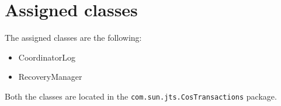 \section{Assigned classes}
\label{sec:classes}

The assigned classes are the following:
\begin{itemize}
    \item CoordinatorLog
    \item RecoveryManager
\end{itemize}

Both the classes are located in the \texttt{com.sun.jts.CosTransactions} package.
